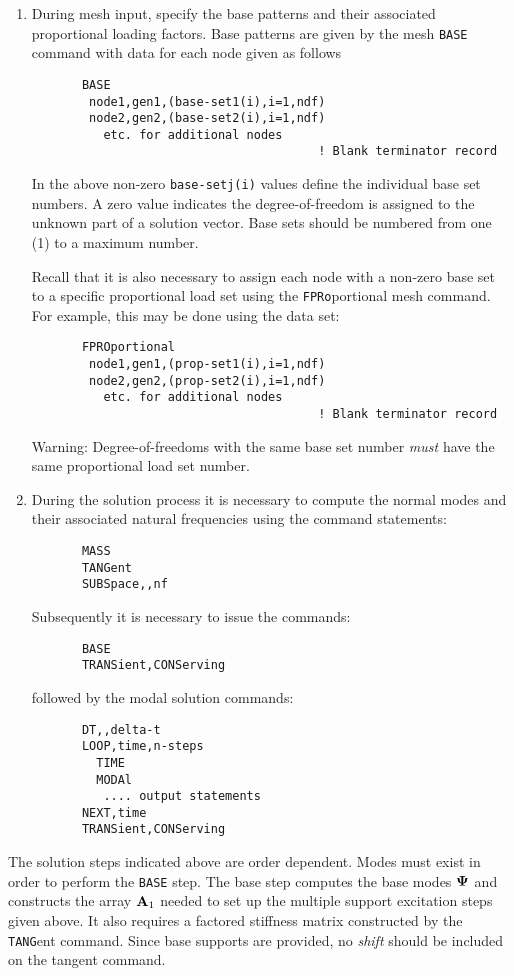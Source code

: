 \begin{enumerate}
\item
During mesh input, specify the base patterns and their associated
proportional loading factors.  Base patterns are given by the mesh {\tt BASE}
command with data for each node given as follows
\begin{verbatim}
       BASE
        node1,gen1,(base-set1(i),i=1,ndf)
        node2,gen2,(base-set2(i),i=1,ndf)
          etc. for additional nodes
                                        ! Blank terminator record
\end{verbatim}
In the above non-zero {\tt base-setj(i)} values define the individual base
set numbers.  A zero value indicates the degree-of-freedom
is assigned to the unknown part of a solution vector.  Base sets
should be numbered from one (1) to a maximum number.

Recall that it
is also necessary to assign each node with a non-zero base set to a
specific proportional load set using the {\tt FPRo}portional mesh command.
For example, this may be done using the data set:
\begin{verbatim}
       FPROportional
        node1,gen1,(prop-set1(i),i=1,ndf)
        node2,gen2,(prop-set2(i),i=1,ndf)
          etc. for additional nodes
                                        ! Blank terminator record
\end{verbatim}
Warning: Degree-of-freedoms with the same base set number {\it must} have
the same proportional load set number.
\item
During the solution process it is necessary to compute the normal modes and
their associated natural frequencies using the command statements:
\begin{verbatim}
       MASS
       TANGent
       SUBSpace,,nf
\end{verbatim}
Subsequently it is necessary to issue the commands:
\begin{verbatim}
       BASE
       TRANSient,CONServing
\end{verbatim}
followed by the modal solution commands:
\begin{verbatim}
       DT,,delta-t
       LOOP,time,n-steps
         TIME
         MODAl
          .... output statements
       NEXT,time
       TRANSient,CONServing
\end{verbatim}
\end{enumerate}

The solution steps indicated above are order dependent.
Modes must exist in order to
perform the {\tt BASE} step.  The base step computes the base modes $\boldsymbol{\Psi}$
and constructs the array $\mathbf{A}_1$ needed to set up the multiple support
excitation steps given above.  It also requires a factored stiffness matrix
constructed by the {\tt TANG}ent command.  Since base supports are provided,
no {\it shift} should be included on the tangent command.

